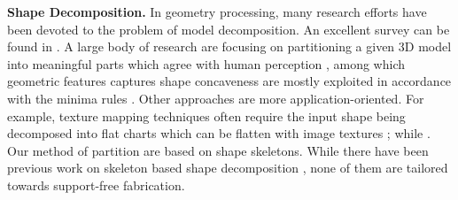 \textbf{Shape Decomposition.} In geometry processing, many research efforts have been devoted to the problem of model decomposition. An excellent survey can be found in \cite{Shamir08}. A large body of research are focusing on partitioning a given 3{D} model into meaningful parts which agree with human perception \cite{KatzT03,KatzLT05,JiLCW06,LiuZ07,Golovinskiy:2008,ChenGF09,KaickFKAC14}, among which geometric features captures shape concaveness are mostly exploited in accordance with the minima rules \cite{hoffman1984parts,hoffman1997salience}. Other approaches are more application-oriented. For example, texture mapping techniques often require the input shape being decomposed into flat charts which can be flatten with image textures \cite{zhou2004iso,}; while . Our method of partition are based on shape skeletons. While there have been previous work on skeleton based shape decomposition \cite{lien2006simultaneous,reniers2007skeleton,AuTCCL08}, none of them are tailored towards support-free fabrication.


